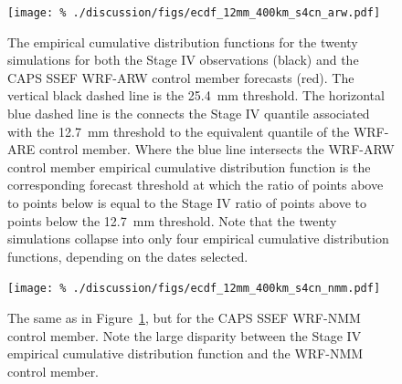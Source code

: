 \clearpage
\begin{figure}[cc]
    \centering
    \texttt{[image: \%
    ./discussion/figs/ecdf\_12mm\_400km\_s4cn\_arw.pdf]}\\
    \caption{The empirical cumulative distribution functions for the twenty simulations for both the Stage IV observations (black) and the CAPS SSEF WRF-ARW control member forecasts (red).
    The vertical black dashed line is the \mbox{25.4 mm} threshold.
    The horizontal blue dashed line is the connects the Stage IV quantile associated with the \mbox{12.7 mm} threshold to the equivalent quantile of the WRF-ARE control member.
    Where the blue line intersects the WRF-ARW control member empirical cumulative distribution function is the corresponding forecast threshold at which the ratio of points above to points below is equal to the Stage IV ratio of points above to points below the \mbox{12.7 mm} threshold.
    Note that the twenty simulations collapse into only four empirical cumulative distribution functions, depending on the dates selected.}
    \label{s4cn_arw_ecdf_12mm_400km}
\end{figure}


\begin{figure}[cc]
    \centering
    \texttt{[image: \%
    ./discussion/figs/ecdf\_12mm\_400km\_s4cn\_nmm.pdf]}\\
    \caption{The same as in \mbox{Figure \ref{s4cn_arw_ecdf_12mm_400km}}, but for the CAPS SSEF WRF-NMM control member.
    Note the large disparity between the Stage IV empirical cumulative distribution function and the WRF-NMM control member.}
    \label{s4cn_nmm_ecdf_12mm_400km}
\end{figure}
